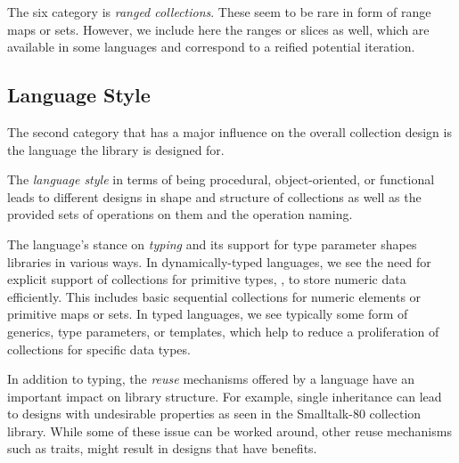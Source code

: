 \documentclass[sigconf, 10pt]{acmart}
\begin{document}
The six category is \emph{ranged collections}.
These seem to be rare in form of range maps or sets.
However, we include here the ranges or slices as well,
which are available in some languages
and correspond to a reified potential iteration.

\subsection{Language Style}

The second category that has a major influence on the overall collection design
is the language the library is designed for.

The \emph{language style} in terms of being procedural, object-oriented,
or functional leads to different designs in shape and structure of collections
as well as the provided sets of operations on them and the operation naming.

The language's stance on \emph{typing} and its support for type parameter
shapes libraries in various ways.
In dynamically-typed languages,
we see the need for explicit support of collections for primitive types, \eg,
to store numeric data efficiently.
This includes basic sequential collections for numeric elements
or primitive maps or sets.
In typed languages,
we see typically some form of generics, type parameters, or templates,
which help to reduce a proliferation of collections for specific data types.

In addition to typing, the \emph{reuse} mechanisms offered by a language have
an important impact on library structure.
For example, single inheritance can lead to designs with undesirable
properties as seen in the Smalltalk-80 collection library\citep{Cook:1992:ISS}.
While some of these issue can be worked around,
other reuse mechanisms such as traits,
might result in designs that have benefits\citep{Black:2003:ATS}.
\end{document}
